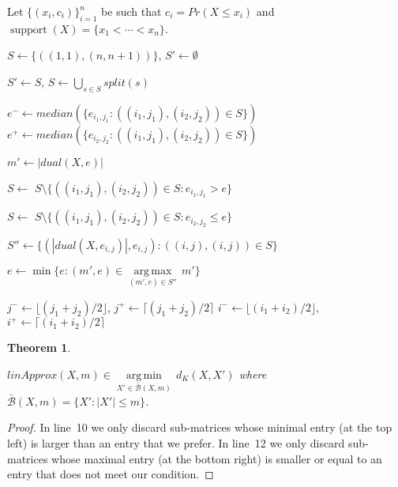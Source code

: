 \documentclass[letterpaper]{article} %
\newtheorem{theorem}[thm]{Theorem}
\DeclareMathOperator{\supp}{support}
\begin{document}
\begin{algorithm}
		\DontPrintSemicolon
		Let $\{(x_i, c_i)\}_{i=1}^n$ be such that $c_i=Pr(X \leq x_i)$ and $\supp(X)=\{x_1 < \cdots < x_n\}$.\;

		$S \gets  \{ ((1, 1),(n,n+1)) \}$, $S' \gets \emptyset$\;
		
		
		{
			$S' \gets S$,
			$S \gets  \bigcup_{s \in S} split(s)$\;
			
			$e^- {\gets} median(\{ e_{i_1,j_1} \colon ((i_1,j_1),(i_2,j_2)) \in S \}) $\;		
			$e^+ {\gets} median(\{ e_{i_2,j_2} \colon ((i_1,j_1),(i_2,j_2)) \in S \}) $\;			

			 {
				$m' \gets |dual(X,e)|$\;
	
				 {
					$S \gets$ $S \setminus \{ ((i_1,j_1),(i_2,j_2)) \in S \colon e_{i_1,j_1} > e \}$ \;
				}
			
				\Else %
				{
					$S \gets$ $S \setminus \{ ((i_1,j_1),(i_2,j_2)) \in S \colon e_{i_2,j_2} \leq e \}$ \;
				}
			}
		}
	
		$S'' \gets \{(|dual(X,e_{i,j})|,e_{i,j}) \colon ((i,j),(i,j)) \in S\}$\;	
	
		$e \gets \min\{e\colon (m',e) \in \underset{(m',e)\in S''}{\operatorname{arg\,max}}\, m'\}$\;

		\caption{$linApprox(X,m)$}   
		\label{alg:linear}
	\end{algorithm}
{
	\begin{algorithm}
		\DontPrintSemicolon
		
		$j^- \gets \lfloor (j_1+j_2)/2 \rfloor$,
		$j^+ \gets \lceil (j_1+j_2)/2 \rceil$\;
		$i^- \gets \lfloor (i_1+i_2)/2 \rfloor$,
		$i^+ \gets \lceil (i_1+i_2)/2 \rceil$\;

		
		\caption{$split(((i_1,j_1),(i_2,j_2)))$}
		\label{proc:split}
	\end{algorithm}
}	
	
	
\begin{theorem}\label{the:correctnessLinear}
	   
    $linApprox(X,m) {\in} \underset{X' \in \bar{\mathcal{B}}(X,m) }{\operatorname{arg\,min}}\, d_K(X,X')$ where $\bar{\mathcal{B}}(X,m)=\{X'\colon |X'| \leq m\}$.
\end{theorem}
\begin{proof}
In line~10 we only discard sub-matrices whose minimal entry (at the top left) is larger than an entry that we prefer. In line~12 we only discard sub-matrices whose maximal entry (at the bottom right) is smaller or equal to an entry that does not meet our condition.
\end{proof}
\end{document}

